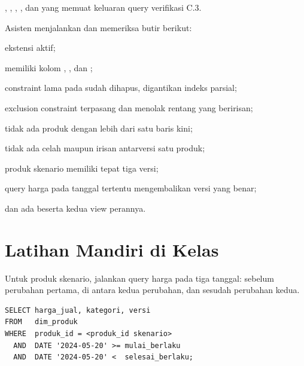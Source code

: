 \begin{luaran}
, ,
, , dan
 yang memuat keluaran query verifikasi C.3.
\end{luaran}

\begin{checkpoint}
Asisten menjalankan  dan memeriksa butir berikut:
\begin{ceklis}
  \item ekstensi  aktif;
  \item {} memiliki kolom ,
        , dan ;
  \item constraint  lama pada  sudah
        dihapus, digantikan indeks parsial;
  \item exclusion constraint terpasang dan menolak rentang yang beririsan;
  \item tidak ada produk dengan lebih dari satu baris kini;
  \item tidak ada celah maupun irisan antarversi satu produk;
  \item produk skenario memiliki tepat tiga versi;
  \item query harga pada tanggal tertentu mengembalikan versi yang benar;
  \item {} dan  ada beserta
        kedua view perannya.
\end{ceklis}
\end{checkpoint}

\section{Latihan Mandiri di Kelas}


Untuk produk skenario, jalankan query harga pada tiga tanggal: sebelum
perubahan pertama, di antara kedua perubahan, dan sesudah perubahan kedua.

\begin{lstlisting}[style=sqlgaya]
SELECT harga_jual, kategori, versi
FROM   dim_produk
WHERE  produk_id = <produk_id skenario>
  AND  DATE '2024-05-20' >= mulai_berlaku
  AND  DATE '2024-05-20' <  selesai_berlaku;
\end{lstlisting}

